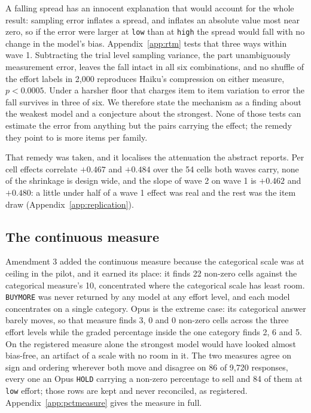 \ifsubmission
A falling spread has an innocent explanation that would account for the whole
result: sampling error inflates a spread, and inflates an absolute value most
near zero, so if the error were larger at \texttt{low} than at \texttt{high}
the spread would fall with no change in the model's bias.
Appendix~\ref{app:rtm} tests that three ways within wave 1. Subtracting the
trial level sampling variance, the part unambiguously measurement error,
leaves the fall intact in all six combinations, and no shuffle of the effort
labels in 2{,}000 reproduces Haiku's compression on either measure,
$p < 0.0005$. Under a harsher floor that charges item to item variation to
error the fall survives in three of six. We therefore state the mechanism as
a finding about the weakest model and a conjecture about the strongest. None
of those tests can estimate the error from anything but the pairs carrying
the effect; the remedy they point to is more items per family.
\else

\fi

\ifsubmission
That remedy was taken, and it localises the attenuation the abstract
reports. Per cell effects correlate $+0.467$ and $+0.484$ over the 54 cells
both waves carry, none of the shrinkage is design wide, and the slope of
wave 2 on wave 1 is $+0.462$ and $+0.480$: a little under half of a wave 1
effect was real and the rest was the item draw
(Appendix~\ref{app:replication}).
\else

\fi

\subsection{The continuous measure}
\ifsubmission
Amendment 3 added the continuous measure because the categorical scale was at
ceiling in the pilot, and it earned its place: it finds 22 non-zero cells
against the categorical measure's 10, concentrated where the categorical
scale has least room. \texttt{BUY\us MORE} was never returned by any model at
any effort level, and each model concentrates on a single category. Opus is
the extreme case: its categorical answer barely moves, so that measure finds
3, 0 and 0 non-zero cells across the three effort levels while the graded
percentage inside the one category finds 2, 6 and 5. On the registered
measure alone the strongest model would have looked almost bias-free, an
artifact of a scale with no room in it. The two measures agree on
sign and ordering wherever both move and disagree on 86 of 9{,}720 responses,
every one an Opus \texttt{HOLD} carrying a non-zero percentage to sell and 84
of them at \texttt{low} effort; those rows are kept and never reconciled, as
registered. Appendix~\ref{app:pctmeasure} gives the measure in full.
\else

\fi

